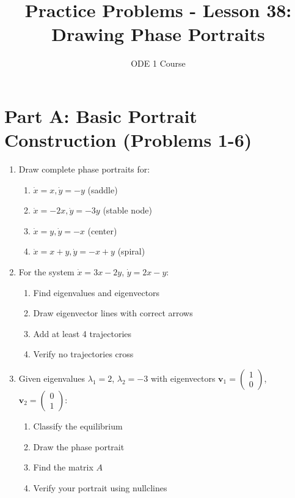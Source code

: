 \documentclass[12pt]{article}
\title{Practice Problems - Lesson 38: Drawing Phase Portraits}
\author{ODE 1 Course}
\date{}
\begin{document}
\maketitle

\section*{Part A: Basic Portrait Construction (Problems 1-6)}

\begin{enumerate}
\item Draw complete phase portraits for:
\begin{enumerate}[label=(\alph*)]
    \item $\dot{x} = x, \dot{y} = -y$ (saddle)
    \item $\dot{x} = -2x, \dot{y} = -3y$ (stable node)
    \item $\dot{x} = y, \dot{y} = -x$ (center)
    \item $\dot{x} = x + y, \dot{y} = -x + y$ (spiral)
\end{enumerate}

\item For the system $\dot{x} = 3x - 2y$, $\dot{y} = 2x - y$:
\begin{enumerate}[label=(\alph*)]
    \item Find eigenvalues and eigenvectors
    \item Draw eigenvector lines with correct arrows
    \item Add at least 4 trajectories
    \item Verify no trajectories cross
\end{enumerate}

\item Given eigenvalues $\lambda_{1} = 2$, $\lambda_{2} = -3$ with eigenvectors $\mathbf{v}_{1} = \begin{pmatrix} 1 \\ 0 \end{pmatrix}$, $\mathbf{v}_{2} = \begin{pmatrix} 0 \\ 1 \end{pmatrix}$:
\begin{enumerate}[label=(\alph*)]
    \item Classify the equilibrium
    \item Draw the phase portrait
    \item Find the matrix $A$
    \item Verify your portrait using nullclines
\end{enumerate}


\end{enumerate}
\end{document}
